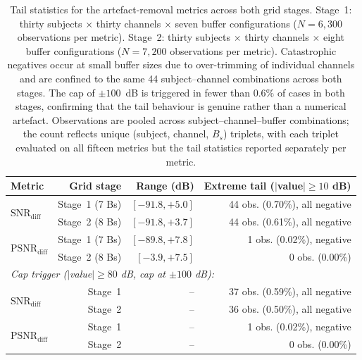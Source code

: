 \documentclass[MScCS,12pt,oneside,final]{uccthesis}
\begin{document}
\begin{table}[!htb]
    \centering
    \begin{tabular}{lrrr}
        \toprule
        \textbf{Metric} & \textbf{Grid stage} & \textbf{Range (dB)} & \textbf{Extreme tail ($|$value$| \geq 10$ dB)} \\
        \midrule
        \multirow{2}{*}{$\mathrm{SNR}_{\mathrm{diff}}$} 
        & Stage~1 (7 Bs) & $[-91.8, +5.0]$ & 44 obs. (0.70\%), all negative \\
        & Stage~2 (8 Bs) & $[-91.8, +3.7]$ & 44 obs. (0.61\%), all negative \\
        \midrule
        \multirow{2}{*}{$\mathrm{PSNR}_{\mathrm{diff}}$} 
        & Stage~1 (7 Bs) & $[-89.8, +7.8]$ & 1 obs. (0.02\%), negative \\
        & Stage~2 (8 Bs) & $[-3.9, +7.5]$ & 0 obs. (0.00\%) \\
        \midrule
        \multicolumn{4}{l}{\textit{Cap trigger ($|$value$| \geq 80$ dB, cap at $\pm 100$ dB):}} \\
        \multirow{2}{*}{$\mathrm{SNR}_{\mathrm{diff}}$} 
        & Stage~1 & -- & 37 obs. (0.59\%), all negative \\
        & Stage~2 & -- & 36 obs. (0.50\%), all negative \\
        \multirow{2}{*}{$\mathrm{PSNR}_{\mathrm{diff}}$} 
        & Stage~1 & -- & 1 obs. (0.02\%), negative \\
        & Stage~2 & -- & 0 obs. (0.00\%) \\
        \bottomrule
    \end{tabular}
    \caption{Tail statistics for the artefact-removal metrics across both grid stages. Stage~1: thirty subjects $\times$ thirty channels $\times$ seven buffer configurations ($N = 6{,}300$ observations per metric). Stage~2: thirty subjects $\times$ thirty channels $\times$ eight buffer configurations ($N = 7{,}200$ observations per metric). Catastrophic negatives occur at small buffer sizes due to over-trimming of individual channels and are confined to the same 44 subject--channel combinations across both stages. The cap of $\pm 100$~dB is triggered in fewer than $0.6\%$ of cases in both stages, confirming that the tail behaviour is genuine rather than a numerical artefact. Observations 
are pooled across subject--channel--buffer combinations; the count reflects unique (subject, 
channel, $B_s$) triplets, with each triplet evaluated on all fifteen metrics but the tail 
statistics reported separately per metric.}
    \label{tab:snr_diff_tail}
\end{table}
\end{document}
